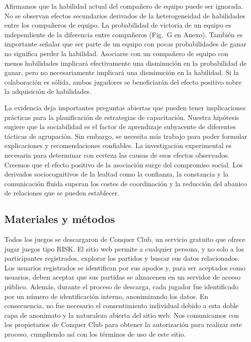 \documentclass[a4paper,10pt]{book}
\theoremstyle{definition}
\begin{document}

Afirmamos que la habilidad actual del compañero de equipo puede ser ignorada.
%
No se observan efectos secundarios derivados de la heterogeneidad de habilidades entre los compañeros de equipo.
%
La probabilidad de victoria de un equipo es independiente de la diferencia entre compañeros (Fig.~G en Anexo).
%
También es importante señalar que ser parte de un equipo con pocas probabilidades de ganar no significa perder la habilidad.
%
Asociarse con un compañero de equipo con menos habilidades implicará efectivamente una disminución en la probabilidad de ganar, pero no necesariamente implicará una disminución en la habilidad.
%
Si la colaboración es sólida, ambos jugadores se beneficiarán del efecto positivo sobre la adquisición de habilidades.


La evidencia deja importantes preguntas abiertas que pueden tener implicaciones prácticas para la planificación de estrategias de capacitación.
%
Nuestra hipótesis sugiere que la sociabilidad es el factor de aprendizaje subyacente de diferentes tácticas de agrupación.
%
Sin embargo, se necesita más trabajo para poder formular explicaciones y recomendaciones confiables.
%
La investigación experimental es necesaria para determinar con certeza las causas de esos efectos observados.
%
Creemos que el efecto positivo de la asociación surge del compromiso social.
%
Los derivados sociocognitivos de la lealtad como la confianza, la constancia y la comunicación fluida superan los costes de coordinación y la reducción del abanico de relaciones que se pueden establecer.


\subsection{Materiales y métodos}

Todos los juegos se descargaron de Conquer Club, un servicio gratuito que ofrece jugar juegos tipo RISK.
%
El sitio web permite a cualquier persona, y no solo a los participantes registrados, explorar los partidos y buscar sus datos relacionados.
%
Los usuarios registrados se identifican por sus apodos y, para ser aceptados como usuarios, deben aceptar que sus partidas se almacenen en un servidor de acceso p\'ublico.
%
Además, durante el proceso de descarga, cada jugador fue identificado por un n\'umero de identificación interno, anonimizando los datos.
%
En consecuencia, no fue necesario el consentimiento individual debido a esta doble capa de anonimato y la naturaleza abierta del sitio web.
%
Nos comunicamos con los propietarios de Conquer Club para obtener la autorización para realizar este proceso, cumpliendo así con los términos de uso de este sitio.
\end{document}
